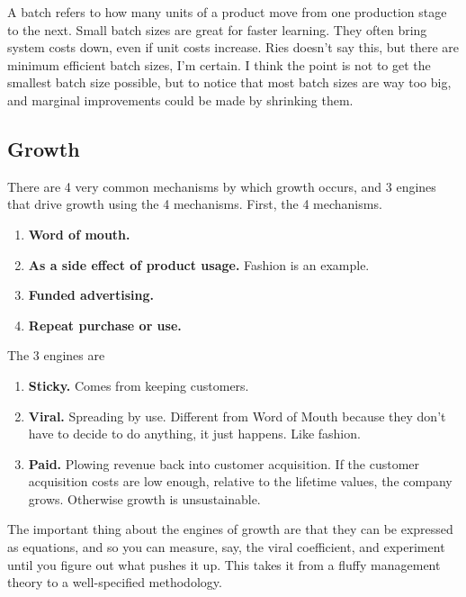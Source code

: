 \documentclass[11pt, oneside]{article}   	%
\begin{document}
A batch refers to how many units of a product move from one production stage to the next.  Small batch sizes are great for faster learning.  They often bring system costs down, even if unit costs increase.  Ries doesn't say this, but there are minimum efficient batch sizes, I'm certain.  I think the point is not to get the smallest batch size possible, but to notice that most batch sizes are way too big, and marginal improvements could be made by shrinking them.

\subsection{Growth}

There are 4 very common mechanisms by which growth occurs, and 3 engines that drive growth using the 4 mechanisms.  First, the 4 mechanisms.

\begin{enumerate}
\item \textbf{Word of mouth.}  
\item \textbf{As a side effect of product usage.}  Fashion is an example.
\item \textbf{Funded advertising.}
\item \textbf{Repeat purchase or use.}
\end{enumerate}  

The 3 engines are

\begin{enumerate}
\item \textbf{Sticky.}  Comes from keeping customers.
\item \textbf{Viral.} Spreading by use.  Different from Word of Mouth because they don't have to decide to do anything, it just happens.  Like fashion.  
\item \textbf{Paid. }  Plowing revenue back into customer acquisition.  If the customer acquisition costs are low enough, relative to the lifetime values, the company grows.  Otherwise growth is unsustainable. 
\end{enumerate}

The important thing about the engines of growth are that they can be expressed as equations, and so you can measure, say, the viral coefficient, and experiment until you figure out what pushes it up.  This takes it from a fluffy management theory to a well-specified methodology.
\end{document}
